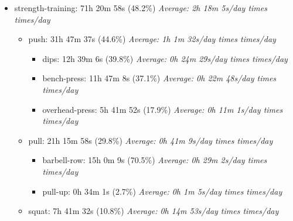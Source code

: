 \documentclass[12pt]{extarticle}
\begin{document}
\begin{itemize}[topsep=0pt, itemsep=-0.5ex]
    \item strength-training: 71h 20m 58s (48.2\%)
        \textit{Average: 2h 18m 5s/day  times  times/day}\par
\begin{itemize}[topsep=0pt, itemsep=-0.5ex]
    \item push: 31h 47m 37s (44.6\%)
        \textit{Average: 1h 1m 32s/day  times  times/day}\par
\begin{itemize}[topsep=0pt, itemsep=-0.5ex]
    \item dips: 12h 39m 6s (39.8\%)
        \textit{Average: 0h 24m 29s/day  times  times/day}\par
    \item bench-press: 11h 47m 8s (37.1\%)
        \textit{Average: 0h 22m 48s/day  times  times/day}\par
    \item overhead-press: 5h 41m 52s (17.9\%)
        \textit{Average: 0h 11m 1s/day  times  times/day}\par
\end{itemize}
    \item pull: 21h 15m 58s (29.8\%)
        \textit{Average: 0h 41m 9s/day  times  times/day}\par
\begin{itemize}[topsep=0pt, itemsep=-0.5ex]
    \item barbell-row: 15h 0m 9s (70.5\%)
        \textit{Average: 0h 29m 2s/day  times  times/day}\par
    \item pull-up: 0h 34m 1s (2.7\%)
        \textit{Average: 0h 1m 5s/day  times  times/day}\par
\end{itemize}
    \item squat: 7h 41m 32s (10.8\%)
        \textit{Average: 0h 14m 53s/day  times  times/day}\par
\begin{itemize}[topsep=0pt, itemsep=-0.5ex]

\end{itemize}
\end{itemize}
\end{itemize}
\end{document}
